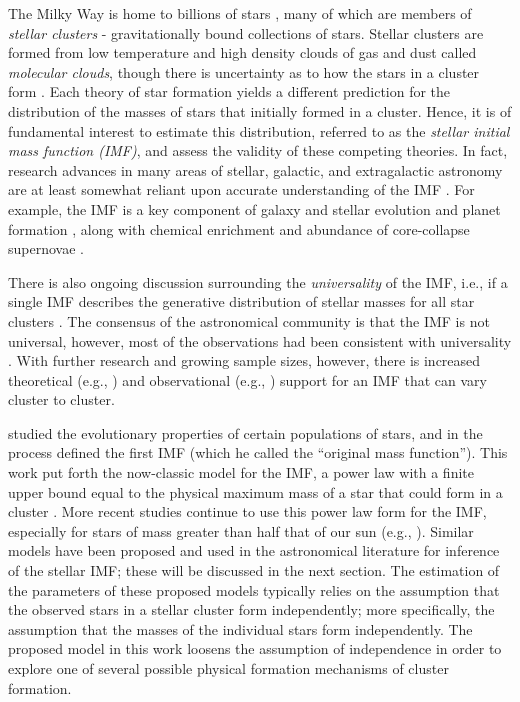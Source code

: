 \documentclass[ejs]{imsart}
\numberwithin{equation}{section}
\theoremstyle{plain}
\begin{document}
The Milky Way is home to billions of stars \citep{McMillan:2016uq}, many of which 
are members of \emph{stellar clusters} - gravitationally bound collections of stars. 
Stellar clusters are formed from low temperature and high density clouds of gas and dust 
called \emph{molecular clouds}, though there 
is uncertainty as to how the stars in a cluster form \citep{Beccari2017}. 
Each theory of star formation yields a different prediction for the distribution
of the masses of stars that initially formed in a cluster. Hence, it is of fundamental 
interest to estimate this distribution, referred to as the \emph{stellar initial mass function (IMF)},
and assess the validity of these competing theories.
In fact, research advances in many areas of stellar, galactic, and extragalactic astronomy are at 
least somewhat reliant upon accurate understanding of the IMF \citep{bastian2010}.
For example, the IMF is a key
component of galaxy and stellar evolution and planet formation \citep{bally2005, bastian2010, Shetty2014}, 
along with chemical enrichment and abundance of core-collapse supernovae \citep{weisz13}.

There is also ongoing discussion surrounding the {\it universality} of the IMF, i.e.,
if a single IMF describes the generative distribution of stellar masses for all
star clusters \citep{bastian2010}. The consensus of the astronomical community is that the IMF is not universal, however, most of the observations had been consistent with universality \citep{kroupa2001, bastian2010, Ashworth2017}.
With further research and growing sample sizes, however, there is increased theoretical 
(e.g., \citealt{bonnell2006, Dib2010})
and observational
(e.g., \citealt{Treu2010, Dokkum:2010fk, Spiniello2014,Geha2013, Dib2017})
support for an IMF that can vary cluster to cluster. %

\cite{salpeter55} studied the evolutionary properties of certain 
populations of stars, and in the process defined the first IMF 
(which he called the ``original mass function'').  
This work put forth the now-classic model for the IMF, a power law 
with a finite upper bound equal to the physical maximum mass of a star that 
could form in a cluster \citep{salpeter55}.  
More recent studies continue to use this power law form for the IMF, especially for stars of mass greater than half that
of our sun (e.g., \citealt{Massey2003, bastian2010, DaRioEtAl2012, Lim2013, weisz13, Weisz:2015kx, Jose2017}).
Similar models have been proposed and used in the astronomical literature for inference of the 
stellar IMF; these will be discussed in the next section. 
The estimation of the parameters of these proposed models typically relies on the assumption that 
the observed stars in a stellar cluster form independently; more specifically, the assumption that the masses of the individual stars form independently. 
The proposed model in this work loosens the assumption of independence in order to explore one of several possible physical formation 
mechanisms of cluster formation.
\end{document}
